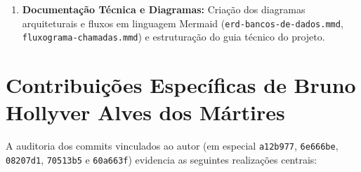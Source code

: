 \documentclass[12pt,a4paper]{report}
\begin{document}
\begin{enumerate}
    \begin{itemize}
        \item Implementação do fluxo completo de **Republicação de Postagens (Repost)** no Flutter e no backend, contemplando persistência de listas de repost e contadores atômicos.
        \item Desenvolvimento do componente modal de busca global com renderização reativa de resultados (\texttt{global\_search\_modal.dart}).
        \item Customização visual das opções de perfil, incluindo alteração da cor de banner e seleção de avatares.
    \end{itemize}
    \item \textbf{Documentação Técnica e Diagramas:} Criação dos diagramas arquiteturais e fluxos em linguagem Mermaid (\texttt{erd-bancos-de-dados.mmd}, \texttt{fluxograma-chamadas.mmd}) e estruturação do guia técnico do projeto.
\end{enumerate}

\section{Contribuições Específicas de Bruno Hollyver Alves dos Mártires}
A auditoria dos commits vinculados ao autor (em especial \texttt{a12b977}, \texttt{6e666be}, \texttt{08207d1}, \texttt{70513b5} e \texttt{60a663f}) evidencia as seguintes realizações centrais:
\end{document}
